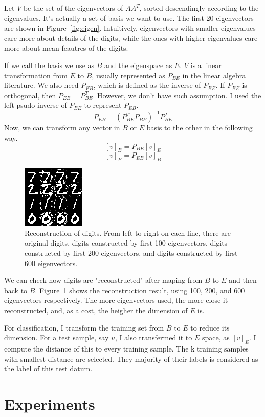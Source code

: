 \documentclass[10pt]{article}
\begin{document}
Let $V$ be the set of the eigenvectors of $AA^T$, sorted descendingly
according to the eigenvalues. It's actually a set of basis we want to
use. The first 20 eigenvectors are shown in Figure~\ref{fig:eigen}.
Intuitively, eigenvectors with smaller eigenvalues care more about
details of the digits, while the ones with higher eigenvalues care
more about mean feautres of the digits.

If we call the basis we use as $B$ and the eigenspace as $E$. $V$
is a linear transformation from $E$ to $B$, usually represented as
$P_{BE}$ in the linear algebra literature. We also need $P_{EB}$,
which is defined as the inverse of $P_{BE}$. If $P_{BE}$ is
orthogonal, then $P_{EB} = P_{BE}^T$.  However, we don't have such
assumption. I used the left psudo-inverse of $P_{BE}$ to represent
$P_{EB}$.
$$P_{EB} = (P_{BE}^T P_{BE})^{-1} P_{BE}^T$$
Now, we can transform any vector in $B$ or $E$ basis to the other in
the following way.
$$[v]_B = P_{BE} [v]_E$$
$$[v]_E = P_{EB} [v]_B$$

\begin{figure}
\centering
\includegraphics[]{test.png}
\caption{Reconstruction of digits. From left to right on each line,
there are original digits, digits constructed by first 100
eigenvectors, digits constructed by first 200 eigenvectors, and digits
constructed by first 600 eigenvectors. }
\label{fig:test}
\end{figure}

We can check how digits are "reconstructed" after maping from $B$ to
$E$ and then back to $B$. Figure~\ref{fig:test} shows the
reconstruction result, using 100, 200, and 600 eigenvectors
respectively. The more eigenvectors used, the more close it
reconstructed, and, as a cost, the heigher the dimension of $E$ is.

For classification, I transform the training set from $B$ to $E$ to
reduce its dimension. For a test sample, say $u$, I also transfermed
it to $E$ space, as $[v]_E$. I compute the distance of this to every
training sample. The k training samples with smallest distance are
selected. They majority of their labels is considered as the label of
this test datum.

\section{Experiments}
\end{document}
